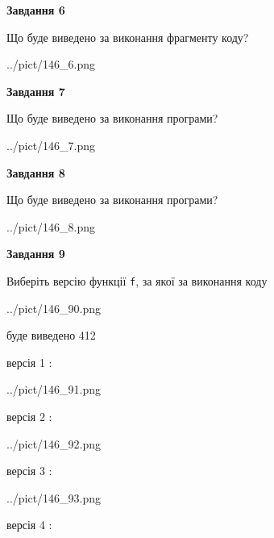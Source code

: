 \documentclass[12pt, ukrainian]{article}
\def\code#1{\Verb!#1!}
\begin{document}
{\begin {large}
{\begin {center}\textbf{Завдання 6}\end {center}}

Що буде виведено за виконання фрагменту коду?\par
\begin{center}
	{../pict/146_6.png}
\end{center}
\newpage

{\begin {center}\textbf{Завдання 7}\end {center}}

Що буде виведено за виконання програми?\par
\begin{center}
	{../pict/146_7.png}
\end{center}
\newpage

{\begin {center}\textbf{Завдання 8}\end {center}}

Що буде виведено за виконання програми?\par
\begin{center}
	{../pict/146_8.png}
\end{center}
\newpage

{\begin {center}\textbf{Завдання 9}\end {center}}

Виберіть версію функції \code{f}, за якої за виконання коду
\begin{center}
	{../pict/146_90.png}
\end{center}
буде виведено 412

\vspace{5mm}
версія 1 :

\begin{center}
	{../pict/146_91.png}
\end{center}
версія 2 :

\begin{center}
	{../pict/146_92.png}
\end{center}
версія 3 :

\begin{center}
	{../pict/146_93.png}
\end{center}
версія 4 :


\end{large}}
\end{document}
